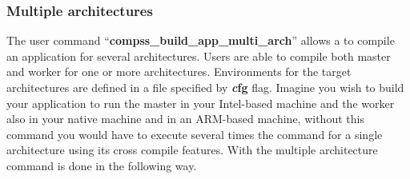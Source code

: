 \subsubsection{Multiple architectures}


The user command ``{\bf compss\_build\_app\_multi\_arch}'' allows a to compile an application for several architectures. Users are able to compile both master and worker for one or more architectures. Environments for the target architectures are defined in a file specified by {\textbf{\textit cfg}} flag. Imagine you wish to build your application to run the master in your Intel-based machine and the worker also in your native machine and in an ARM-based machine, without this command you would have to execute several times the command for a single architecture using its cross compile features. With the multiple architecture command is done in the following way.

